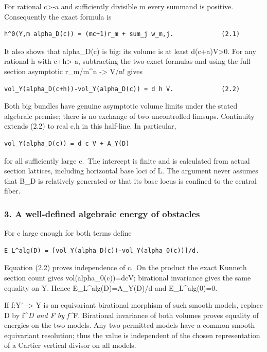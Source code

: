 \documentclass[
  10pt,
]{article}
\begin{document}
For rational c\textgreater-a and sufficiently divisible m every summand
is positive. Consequently the exact formula is

\begin{verbatim}
h^0(Y,m alpha_D(c)) = (mc+1)r_m + sum_j w_m,j.             (2.1)
\end{verbatim}

It also shows that alpha\_D(c) is big: its volume is at least
d(c+a)V\textgreater0. For any rational h with c+h\textgreater-a,
subtracting the two exact formulas and using the full-section asymptotic
r\_m/m\^{}n -\textgreater{} V/n! gives

\begin{verbatim}
vol_Y(alpha_D(c+h))-vol_Y(alpha_D(c)) = d h V.             (2.2)
\end{verbatim}

Both big bundles have genuine asymptotic volume limits under the stated
algebraic premise; there is no exchange of two uncontrolled limsups.
Continuity extends (2.2) to real c,h in this half-line. In particular,

\begin{verbatim}
vol_Y(alpha_D(c)) = d c V + A_Y(D)
\end{verbatim}

for all sufficiently large c.~The intercept is finite and is calculated
from actual section lattices, including horizontal base loci of L. The
argument never assumes that B\_D is relatively generated or that its
base locus is confined to the central fiber.

\subsubsection{3. A well-defined algebraic energy of
obstacles}\label{a-well-defined-algebraic-energy-of-obstacles}

For c large enough for both terms define

\begin{verbatim}
E_L^alg(D) = [vol_Y(alpha_D(c))-vol_Y(alpha_0(c))]/d.
\end{verbatim}

Equation (2.2) proves independence of c.~On the product the exact
Kunneth section count gives vol(alpha\_0(c))=dcV; birational invariance
gives the same equality on Y. Hence E\_L\^{}alg(D)=A\_Y(D)/d and
E\_L\^{}alg(0)=0.

If f:Y' -\textgreater{} Y is an equivariant birational morphism of such
smooth models, replace D by f\^{}\emph{D and F by f\^{}}F. Birational
invariance of both volumes proves equality of energies on the two
models. Any two permitted models have a common smooth equivariant
resolution; thus the value is independent of the chosen representation
of a Cartier vertical divisor on all models.
\end{document}
